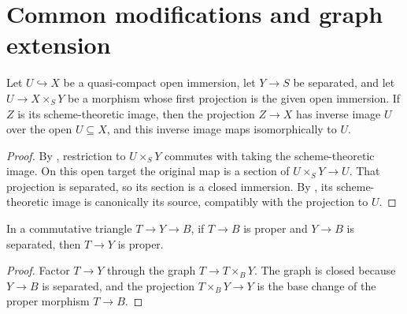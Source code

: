 \section{Common modifications and graph extension}

\begin{lemma}
  \label{lemma:nagata-scheme-image-partial-section}
  \leanok

  Let \(U\hookrightarrow X\) be a quasi-compact open immersion, let
  \(Y\to S\) be separated, and let
  \(U\to X\times_SY\) be a morphism whose first projection is the given open
  immersion.  If \(Z\) is its scheme-theoretic image, then the projection
  \(Z\to X\) has inverse image \(U\) over the open \(U\subseteq X\), and this
  inverse image maps isomorphically to \(U\).
\end{lemma}

\begin{proof}
  \leanok
  By , restriction to
  \(U\times_SY\) commutes with taking the scheme-theoretic image.  On this
  open target the original map is a section of
  \(U\times_SY\to U\).  That projection is separated, so its section is a
  closed immersion.  By
  , its
  scheme-theoretic image is canonically its source, compatibly with the
  projection to $U$.
\end{proof}

\begin{lemma}
  \label{lemma:nagata-proper-to-separated-target}
  \leanok

  In a commutative triangle $T\to Y\to B$, if $T\to B$ is proper and
  $Y\to B$ is separated, then $T\to Y$ is proper.
\end{lemma}

\begin{proof}
  \leanok
  Factor $T\to Y$ through the graph
  $T\to T\times_BY$.  The graph is closed because $Y\to B$ is separated, and
  the projection $T\times_BY\to Y$ is the base change of the proper morphism
  $T\to B$.
\end{proof}

